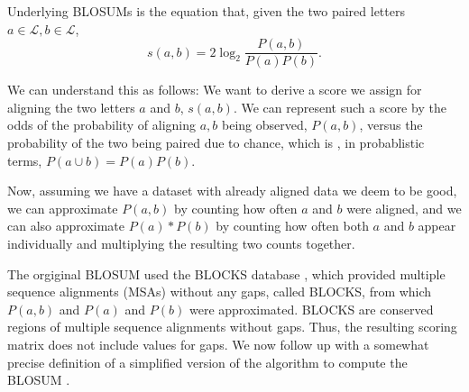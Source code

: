 \documentclass{article}
\begin{document}
Underlying BLOSUMs is the equation that, given the two paired letters $a \in
    \mathcal L, b \in \mathcal L$,
\begin{equation*}
    s(a, b)= 2 \log_2 \frac{P(a, b)}{P(a)P(b)}.
\end{equation*}

We can understand this as follows: We want to derive a score we assign
for aligning the two letters $a$ and $b$, $s(a,b)$. We can represent such
a score by the odds of the probability of aligning $a, b$ being observed,
$P(a, b)$, versus the probability of the two being paired due to chance, which is
, in probablistic terms, $P(a \cup b) = P(a)P(b)$.

Now, assuming we have a dataset with already aligned data we deem to be good, we
can approximate $P(a, b)$ by counting how often $a$ and $b$ were aligned, and
we can also approximate $P(a)*P(b)$ by counting how often both $a$ and $b$ appear
individually and multiplying the resulting two counts together.

The orgiginal BLOSUM used the BLOCKS database
\cite{henikoffAutomatedAssemblyProtein1991}, which provided multiple sequence
alignments (MSAs) without any gaps, called BLOCKS, from which $P(a, b)$ and $P(a)$ and $P(b)$
were approximated. BLOCKS are conserved regions of multiple sequence alignments without
gaps. Thus, the resulting scoring matrix does not include values for gaps. We now follow up with
a somewhat precise definition of a simplified version of the algorithm to compute the BLOSUM .
\end{document}
